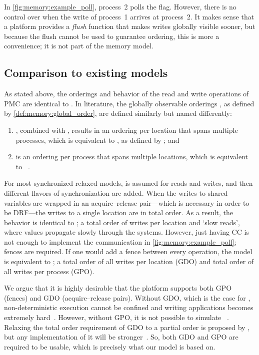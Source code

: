 In \vref{fig:memory:example_poll}, process~2 polls the flag.
However, there is no control over when the write of process~1 arrives at process~2.
It makes sense that a platform provides a \emph{flush} function that makes writes globally visible sooner, but because the flush cannot be used to guarantee ordering, this is more a convenience; it is not part of the memory model.

\subsection{Comparison to existing models}
\label{s:memory:compare_model}

As stated above, the orderings and behavior of the read and write operations of \ac{PMC} are identical to \SlowC*.
In literature, the globally observable orderings \SYMorderglobal*, as defined by \cref{def:memory:global_order}, are defined similarly but named differently:
\begin{enumerate}
\item \SYMorderprog*, combined with \SYMordersync*, results in an ordering per location that spans multiple processes, which is equivalent to , as defined by \citet{steinke:unified}; and
\item \SYMorderfence* is an ordering per process that spans multiple locations, which is equivalent to ~\cite{steinke:unified}.
\end{enumerate}

For most synchronized relaxed models, \SlowC is assumed for reads and writes, and then different flavors of synchronization are added.
When the writes to shared variables are wrapped in an acquire--release pair---which is necessary in order to be \acl{DRF}---the writes to a single location are in total order.
As a result, the behavior is identical to ; a total order of writes per location and `slow reads', where values propagate slowly through the systems. %
However, just having \ac{CC} is not enough to implement the communication in \vref{fig:memory:example_poll}; fences are required.
If one would add a fence between every operation, the model is equivalent to ; a total order of all writes per location (\ac{GDO}) and total order of all writes per process (\ac{GPO}). %

We argue that it is highly desirable that the platform supports both \ac{GPO} (\ie fences) and \ac{GDO} (\ie acquire--release pairs).
Without \ac{GDO}, which is the case for , non-deterministic execution cannot be confined and writing applications becomes extremely hard~\cite{frigo:weakest_memory_model}.
However, without \ac{GPO}, it is not possible to simulate ~\cite{wallace:location_consistency}.
Relaxing the total order requirement of \ac{GDO} to a partial order is proposed by \citet{gao:location_consistency}, but any implementation of it will be stronger~\cite{frigo:weakest_memory_model}.
So, both \ac{GDO} and \ac{GPO} are required to be usable, which is precisely what our model is based on.

